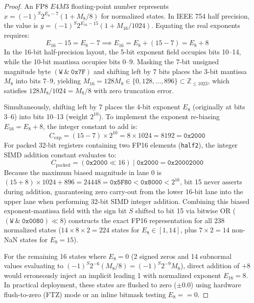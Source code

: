 \documentclass[10pt,twocolumn,letterpaper]{article}
\begin{document}
\begin{proof}
An FP8 $E4M3$ floating-point number represents $x = (-1)^S 2^{E_8 - 7} (1 + M_8/8)$ for normalized states. In IEEE 754 half precision, the value is $y = (-1)^S 2^{E_{16} - 15} (1 + M_{16}/1024)$. Equating the real exponents requires:
\begin{equation}
E_{16} - 15 = E_8 - 7 \implies E_{16} = E_8 + (15 - 7) = E_8 + 8
\end{equation}
In the 16-bit half-precision layout, the 5-bit exponent field occupies bits 10--14, while the 10-bit mantissa occupies bits 0--9. Masking the 7-bit unsigned magnitude byte $(\texttt{W} \ \& \ \texttt{0x7F})$ and shifting left by 7 bits places the 3-bit mantissa $M_8$ into bits 7--9, yielding $M_{16} = 128 M_8 \in \{0, 128, \dots, 896\} \subset \mathbb{Z}_{\le 1023}$, which satisfies $128 M_8 / 1024 = M_8 / 8$ with zero truncation error.

Simultaneously, shifting left by 7 places the 4-bit exponent $E_8$ (originally at bits 3--6) into bits 10--13 (weight $2^{10}$). To implement the exponent re-biasing $E_{16} = E_8 + 8$, the integer constant to add is:
\begin{equation}
C_{\text{exp}} = (15 - 7) \times 2^{10} = 8 \times 1024 = 8192 = \texttt{0x2000}
\end{equation}
For packed 32-bit registers containing two FP16 elements (\texttt{half2}), the integer SIMD addition constant evaluates to:
\begin{equation}
C_{\text{packed}} = (\texttt{0x2000} \ll 16) \mid \texttt{0x2000} = \texttt{0x20002000}
\end{equation}
Because the maximum biased magnitude in lane 0 is $(15 + 8) \times 1024 + 896 = 24448 = \texttt{0x5F80} < \texttt{0x8000} < 2^{16}$, bit 15 never asserts during addition, guaranteeing zero carry-out from the lower 16-bit lane into the upper lane when performing 32-bit SIMD integer addition. Combining this biased exponent-mantissa field with the sign bit $S$ shifted to bit 15 via bitwise OR ($(\texttt{W} \ \& \ \texttt{0x0080}) \ll 8$) constructs the exact FP16 representation for all 238 normalized states ($14 \times 8 \times 2 = 224$ states for $E_8 \in [1, 14]$, plus $7 \times 2 = 14$ non-NaN states for $E_8 = 15$).

For the remaining 16 states where $E_8 = 0$ (2 signed zeros and 14 subnormal values evaluating to $(-1)^S 2^{-6} (M_8/8) = (-1)^S 2^{-9} M_8$), direct addition of $+8$ would erroneously inject an implicit leading 1 with normalized exponent $E_{16} = 8$. In practical deployment, these states are flushed to zero ($\pm 0.0$) using hardware flush-to-zero (FTZ) mode or an inline bitmask testing $E_8 == 0$.
\end{proof}
\end{document}
